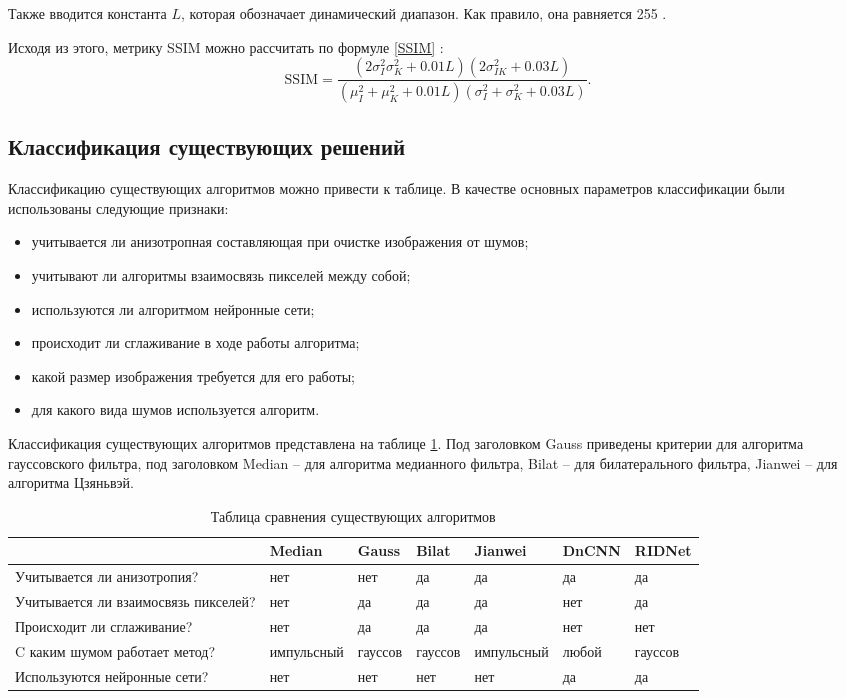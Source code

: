 Также вводится константа $L$, которая обозначает динамический диапазон. 
Как правило, она равняется 255 \cite{ssim}. 

Исходя из этого, метрику SSIM можно рассчитать по формуле \eqref{SSIM} \cite{ssim}:
\begin{equation}
	\label{SSIM}
	\mathrm{SSIM} = \frac{(2\sigma^2_{I}\sigma^2_{K} + 0.01L)(2\sigma^2_{IK} + 0.03L)} { (\mu^2_{I}+\mu^2_{K} +0.01L)  (\sigma^2_{I} +\sigma^2_{K} +0.03L) }.
\end{equation}

\newpage
\subsection{Классификация существующих решений}
Классификацию существующих алгоритмов можно привести к таблице.
В качестве основных параметров классификации были использованы следующие признаки:
\begin{itemize}
	\item учитывается ли анизотропная составляющая при очистке изображения от шумов;
	\item учитывают ли алгоритмы взаимосвязь пикселей между собой;
	\item используются ли алгоритмом нейронные сети;
	\item происходит ли сглаживание в ходе работы алгоритма;
	\item какой размер изображения требуется для его работы;
	\item для какого вида шумов используется алгоритм.
\end{itemize}

Классификация существующих алгоритмов представлена на таблице \ref{table::class}.
Под заголовком Gauss приведены критерии для алгоритма гауссовского фильтра, под заголовком Median -- для алгоритма медианного фильтра, Bilat -- для билатерального фильтра, Jianwei -- для алгоритма Цзяньвэй.
\FloatBarrier
\begin{table}[h]
	\caption{Таблица сравнения существующих алгоритмов}
	\captionsetup{justification=raggedleft}
	\centering
	\begin{tabular}{ | p{4cm} | p{1.6cm} | p{1.7cm} | p{1.7cm} | p{1.5cm} | p{1.7cm}| p{1.7cm} |}
		\hline
		& Median  & Gauss & Bilat & Jianwei & DnCNN &  RIDNet \\ 
		\hline
		Учитывается ли
		анизотропия?     & нет          & нет	  	 &  да        &	да & да & да \\
		\hline
		Учитывается ли взаимосвязь пикселей?   & нет  & да  	 &  да	   &	да		& нет & да \\
		\hline
		Происходит ли сглаживание? & нет 	& да & да & да & нет &  нет	   \\
		\hline
		C каким шумом работает метод?  & импульсный & гауссов &  гауссов  & импульсный & любой & гауссов \\
		\hline
		Используются нейронные сети?  & нет 	& нет 		 &  нет	   &	нет		& да & да \\
		\hline
	\end{tabular}
	\label{table::class}
\end{table}

